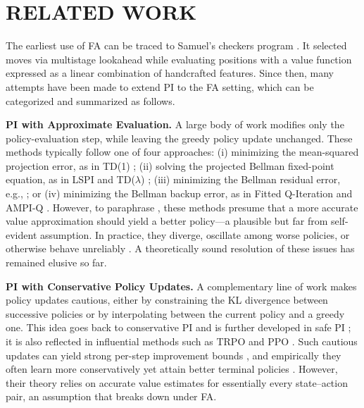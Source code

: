 \documentclass[twoside]{article}
\theoremstyle{plain}
\theoremstyle{definition}
\theoremstyle{remark}
\begin{document}
\section{RELATED WORK}
\label{s:related.work}
%
The earliest use of FA can be traced to Samuel’s checkers program \citep{samuel1959some,samuel1967some}. It selected moves via multistage lookahead while evaluating positions with a value function expressed as a linear combination of handcrafted features. Since then, many attempts have been made to extend PI to the FA setting, which can be categorized and summarized as follows.

\textbf{PI with Approximate Evaluation.} A large body of work modifies only the policy-evaluation step, while leaving the greedy policy update unchanged. These methods typically follow one of four approaches: (i) minimizing the mean-squared projection error, as in TD(1) \citep{tsitsiklis1996analysis}; (ii) solving the projected Bellman fixed-point equation, as in LSPI and TD($\lambda$)  \citep{lagoudakis2003least,tsitsiklis1996analysis}; (iii) minimizing the Bellman residual error, e.g.,  \citep{scherrer2010should}; or (iv) minimizing the Bellman backup error, as in Fitted Q-Iteration and AMPI-Q \citep{ernst2005tree,dqn,ampi}. However, to paraphrase \citet{bertsekas2011approximate}, these methods presume that a more accurate value approximation should yield a better policy---a plausible but far from self-evident assumption. In practice, they diverge, oscillate among worse policies, or otherwise behave unreliably \citep{bertsekas2011approximate,patterson2024empirical,gopalan2025does,young2020understanding}. A theoretically sound resolution of these issues has remained elusive so far. 

\textbf{PI with Conservative Policy Updates.} A complementary line of work makes policy updates cautious, either by constraining the KL divergence between successive policies or by interpolating between the current policy and a greedy one. This idea goes back to conservative PI \citep{kakade2002approximately} and is further developed in safe PI \citep{metelli2021safe}; it is also reflected in influential methods such as TRPO \citep{trpo} and PPO \citep{schulman2017proximal}. Such cautious updates can yield strong per-step improvement bounds \citep[Remark~3]{metelli2021safe}, and empirically they often learn more conservatively yet attain better terminal policies \citep[Figures~9,~13]{metelli2021safe}. However, their theory relies on accurate value estimates for essentially every state--action pair, an assumption that breaks down under FA.
\end{document}
